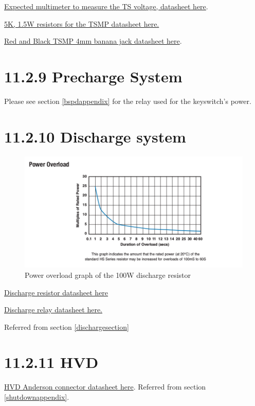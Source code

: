 \documentclass{article}
\begin{document}
{\href{https://www.gossenmetrawatt.com/resources/tt/hit27/db_gb.pdf}{Expected multimeter to measure the TS voltage, datasheet here}.

\href{http://www.mouser.com/ds/2/427/cmfind-239942.pdf}{5K, 1.5W resistors for the TSMP datasheet here.}

\href{http://www.mouser.com/ds/2/159/D72930_02_10_06-21562.pdf}{Red and Black TSMP 4mm banana jack datasheet here}.

\section*{11.2.9 Precharge System}
\label{prechargeappendix}

Please see section \ref{bspdappendix} for the relay used for the keyswitch's power.

\section*{11.2.10 Discharge system} \label{dischargeappendix}

\begin{figure}[H]
    \centering
    \includegraphics[width = 0.8 \textwidth]{Dischargeres}
    \caption{Power overload graph of the 100W discharge resistor}
    \label{disres}
\end{figure}

\href{http://www.farnell.com/datasheets/1498243.pdf}{Discharge resistor datasheet here}

\href{http://cotorelay.com/product/5500-series-high-voltage-reed-relays/}{Discharge relay datasheet here.}

Referred from section \ref{dischargesection}

\section*{11.2.11 HVD } \label{hvdappendix}

\href{http://www.andersonpower.com/_global-assets/downloads/pdf/ds-smart.pdf}{HVD Anderson connector datasheet here}. Referred from section \ref{shutdownappendix}.

}
\end{document}
